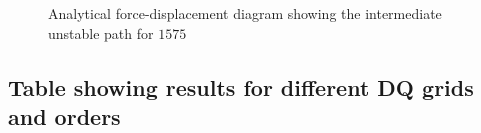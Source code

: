 \documentclass[journal]{new-aiaa}
\begin{document}
\begin{figure}[!h]
	\captionsetup[subfloat]{farskip=2pt,captionskip=2pt}
	\centering
	{
		          
	}
	\caption{Analytical force-displacement diagram showing the intermediate unstable path for $1575$}
	\label{fig:rxn}
\end{figure}

%		          

\subsection{Table showing results for different DQ grids and orders}

\end{document}
